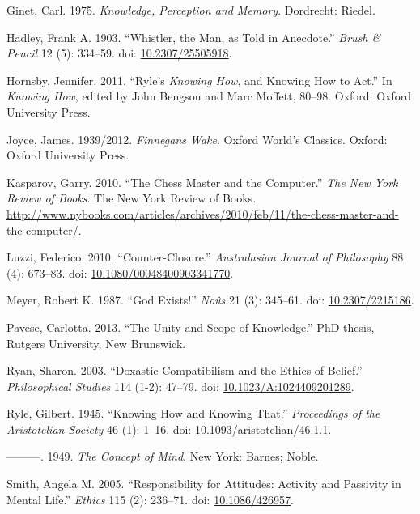 \documentclass[
  10pt,
  letterpaper,
  DIV=11,
  numbers=noendperiod,
  twoside]{scrartcl}
\newlength{\cslhangindent}
\newenvironment{CSLReferences}[2] %
 {\begin{list}{}{%
  \setlength{\itemindent}{0pt}
  \setlength{\leftmargin}{0pt}
  \setlength{\parsep}{0pt}
  \ifodd #1
   \setlength{\leftmargin}{\cslhangindent}
   \setlength{\itemindent}{-1\cslhangindent}
  \fi
  \setlength{\itemsep}{#2\baselineskip}}}
 {\end{list}}
\begin{document}
\begin{CSLReferences}{1}{0}
Ginet, Carl. 1975. \emph{Knowledge, Perception and Memory}. Dordrecht:
Riedel.

Hadley, Frank A. 1903. {``Whistler, the Man, as Told in Anecdote.''}
\emph{Brush \& Pencil} 12 (5): 334--59. doi:
\href{https://doi.org/10.2307/25505918}{10.2307/25505918}.

Hornsby, Jennifer. 2011. {``Ryle's \emph{Knowing How}, and Knowing How
to Act.''} In \emph{Knowing How}, edited by John Bengson and Marc
Moffett, 80--98. Oxford: Oxford University Press.

Joyce, James. 1939/2012. \emph{Finnegans Wake}. Oxford World's Classics.
Oxford: Oxford University Press.

Kasparov, Garry. 2010. {``The Chess Master and the Computer.''}
\emph{The New York Review of Books}. The New York Review of Books.
\url{http://www.nybooks.com/articles/archives/2010/feb/11/the-chess-master-and-the-computer/}.

Luzzi, Federico. 2010. {``Counter-Closure.''} \emph{Australasian Journal
of Philosophy} 88 (4): 673--83. doi:
\href{https://doi.org/10.1080/00048400903341770}{10.1080/00048400903341770}.

Meyer, Robert K. 1987. {``God Exists!''} \emph{No{û}s} 21 (3): 345--61.
doi: \href{https://doi.org/10.2307/2215186}{10.2307/2215186}.

Pavese, Carlotta. 2013. {``The Unity and Scope of Knowledge.''} PhD
thesis, Rutgers University, New Brunswick.

Ryan, Sharon. 2003. {``Doxastic Compatibilism and the Ethics of
Belief.''} \emph{Philosophical Studies} 114 (1-2): 47--79. doi:
\href{https://doi.org/10.1023/A:1024409201289}{10.1023/A:1024409201289}.

Ryle, Gilbert. 1945. {``Knowing How and Knowing That.''}
\emph{Proceedings of the Aristotelian Society} 46 (1): 1--16. doi:
\href{https://doi.org/10.1093/aristotelian/46.1.1}{10.1093/aristotelian/46.1.1}.

---------. 1949. \emph{The Concept of Mind}. New York: Barnes; Noble.

Smith, Angela M. 2005. {``Responsibility for Attitudes: Activity and
Passivity in Mental Life.''} \emph{Ethics} 115 (2): 236--71. doi:
\href{https://doi.org/10.1086/426957}{10.1086/426957}.


\end{CSLReferences}
\end{document}

